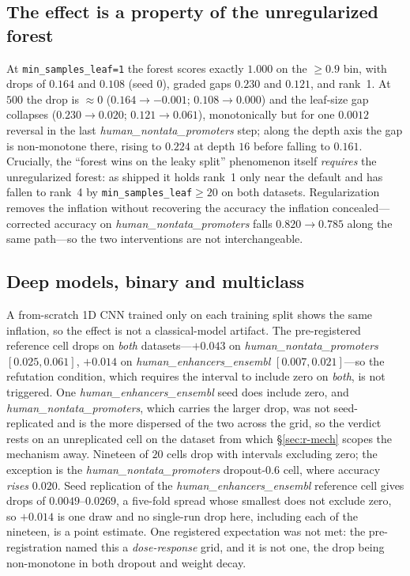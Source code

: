 \documentclass[webpdf,modern,large,namedate]{oup-authoring-template}%
\begin{document}
\subsection{The effect is a property of the unregularized forest}\label{sec:r-regpath}
At \texttt{min\_samples\_leaf=1} the forest scores exactly $1.000$ on the $\ge0.9$ bin, with drops of $0.164$ and $0.108$ (seed $0$), graded gaps $0.230$ and $0.121$, and rank~1. At $500$ the drop is $\approx0$ ($0.164\to-0.001$; $0.108\to0.000$) and the leaf-size gap collapses ($0.230\to0.020$; $0.121\to0.061$), monotonically but for one $0.0012$ reversal in the last \textit{human\_nontata\_promoters} step; along the depth axis the gap is non-monotone there, rising to $0.224$ at depth $16$ before falling to $0.161$. Crucially, the ``forest wins on the leaky split'' phenomenon itself \emph{requires} the unregularized forest: as shipped it holds rank~1 only near the default and has fallen to rank~4 by \texttt{min\_samples\_leaf}$\ge20$ on both datasets. Regularization removes the inflation without recovering the accuracy the inflation concealed---corrected accuracy on \textit{human\_nontata\_promoters} falls $0.820\to0.785$ along the same path---so the two interventions are not interchangeable.

\subsection{Deep models, binary and multiclass}\label{sec:r-deep}
A from-scratch 1D CNN trained only on each training split shows the same inflation, so the effect is not a classical-model artifact. The pre-registered reference cell drops on \emph{both} datasets---$+0.043$ on \textit{human\_nontata\_promoters} $[0.025,0.061]$, $+0.014$ on \textit{human\_enhancers\_ensembl} $[0.007,0.021]$---so the refutation condition, which requires the interval to include zero on \emph{both}, is not triggered. One \textit{human\_enhancers\_ensembl} seed does include zero, and \textit{human\_nontata\_promoters}, which carries the larger drop, was not seed-replicated and is the more dispersed of the two across the grid, so the verdict rests on an unreplicated cell on the dataset from which \S\ref{sec:r-mech} scopes the mechanism away. Nineteen of $20$ cells drop with intervals excluding zero; the exception is the \textit{human\_nontata\_promoters} dropout-$0.6$ cell, where accuracy \emph{rises} $0.020$. Seed replication of the \textit{human\_enhancers\_ensembl} reference cell gives drops of $0.0049$--$0.0269$, a five-fold spread whose smallest does not exclude zero, so $+0.014$ is one draw and no single-run drop here, including each of the nineteen, is a point estimate. One registered expectation was not met: the pre-registration named this a \emph{dose-response} grid, and it is not one, the drop being non-monotone in both dropout and weight decay.
\end{document}
